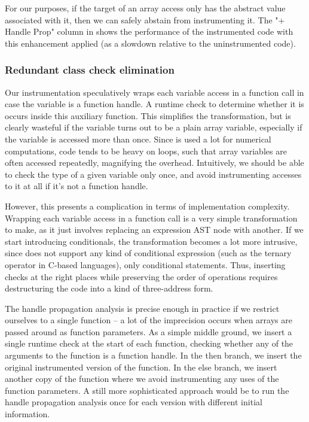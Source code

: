 For our purposes, if the target of an array access only has the 
abstract value associated with it, then we can safely abstain from
instrumenting it. The "+ Handle Prop" column in
 shows the performance of the
instrumented code with this enhancement applied (as a slowdown relative to
the uninstrumented code).


\subsubsection{Redundant class check elimination}

Our instrumentation speculatively wraps each variable access in a function call
in case the variable is a function handle. A runtime check to determine whether
it is occurs inside this auxiliary function. This simplifies the
transformation, but is clearly wasteful if the variable turns out to be a plain
array variable, especially if the variable is accessed more than once. Since
\matlab is used a lot for numerical computations, \matlab code tends to be
heavy on loops, such that array variables are often accessed repeatedly,
magnifying the overhead. Intuitively, we should be able to check the type of a
given variable only once, and avoid instrumenting accesses to it at all if it's
not a function handle.

However, this presents a complication in terms of implementation complexity.
Wrapping each variable access in a function call is a very simple
transformation to make, as it just involves replacing an expression AST node
with another. If we start introducing conditionals, the transformation becomes
a lot more intrusive, since \matlab does not support any kind of conditional
expression (such as the ternary \code{\?:} operator in C-based languages), only
conditional statements. Thus, inserting checks at the right places while
preserving the order of operations requires destructuring the code into a kind
of three-address form.

The handle propagation analysis is precise enough in practice if we restrict
ourselves to a single function -- a lot of the imprecision occurs when arrays
are passed around as function parameters. As a simple middle ground, we insert
a single runtime check at the start of each function, checking whether any of
the arguments to the function is a function handle. In the then branch, we
insert the original instrumented version of the function. In the else branch,
we insert another copy of the function where we avoid instrumenting any uses of
the function parameters. A still more sophisticated approach would be to run
the handle propagation analysis once for each version with different initial
information.

